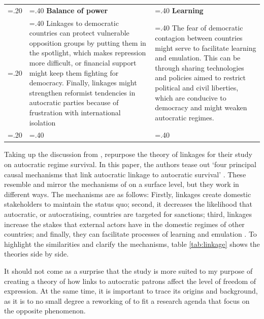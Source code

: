 \begin{table}[p]
{\begin{tabularx}{\textwidth} {
 >{\centering\arraybackslash\hsize=.20\hsize}X 
 >{\noindent\justifying\arraybackslash\hsize=.40\hsize}X 
 >{\noindent\justifying\arraybackslash\hsize=.40\hsize}X}
 & \textbf{Balance of power}
 & \textbf{Learning} \\
\addlinespace
 & Linkages to democratic countries can protect vulnerable opposition groups by putting them in the spotlight, which makes repression more difficult, or financial support might keep them fighting for democracy. Finally, linkages might strengthen reformist tendencies in autocratic parties because of frustration with international isolation
 & The fear of democratic contagion between countries might serve to facilitate learning and emulation. This can be through sharing technologies and policies aimed to restrict political and civil liberties, which are conducive to democracy and might weaken autocratic regimes. \\
\bottomrule
 
 \multicolumn{3}{p{\textwidth}}{\raggedright{\textit{Mechanisms are found in \citet[pp. 383-386]{levitsky_linkage_2006} and \citet[pp. 1225-1227]{tansey_ties_2017}}}}

\end{tabularx}
} %
\end{table}

Taking up the discussion from \citeauthor{levitsky_linkage_2006}, \citet{tansey_ties_2017} repurpose the theory of linkages for their study on autocratic regime survival. In this paper, the authors tease out `four principal causal mechanisms that link autocratic linkage to autocratic survival' \citep[p. 1225]{tansey_ties_2017}. These resemble and mirror the mechanisms of \citeauthor{levitsky_linkage_2006} on a surface level, but they work in different ways. The mechanisms are as follows: Firstly, linkages create domestic stakeholders to maintain the status quo; second, it decreases the likelihood that autocratic, or autocratising, countries are targeted for sanctions; third, linkages increase the stakes that external actors have in the domestic regimes of other countries; and finally, they can facilitate processes of learning and emulation \citep[pp. 1225-1227]{tansey_ties_2017}. To highlight the similarities and clarify the mechanisms, table \ref{tab:linkage} shows the theories side by side. 

It should not come as a surprise that the \citeauthor{tansey_ties_2017} study is more suited to my purpose of creating a theory of how links to autocratic patrons affect the level of freedom of expression. At the same time, it is important to trace its origins and background, as it is to no small degree a reworking of \citeauthor{levitsky_linkage_2006} to fit a research agenda that focus on the opposite phenomenon. 

